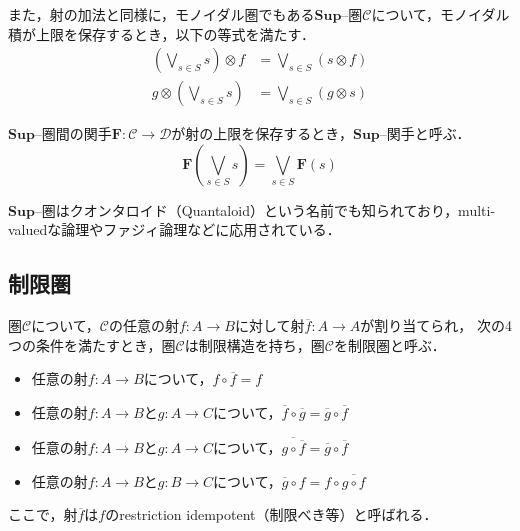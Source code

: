 \documentclass[type_judgement.tex]{subfiles}
\begin{document}
また，射の加法と同様に，モノイダル圏でもある$\mathbf{Sup}$--圏$\mathcal{C}$について，モノイダル積が上限を保存するとき，以下の等式を満たす．
\begin{align*}
  \left(\bigvee_{s\in S}s\right) \otimes f &= \bigvee_{s\in S}\left(s \otimes f\right) \\
  g \otimes \left(\bigvee_{s\in S}s\right) &= \bigvee_{s\in S}\left(g \otimes s\right)
\end{align*}

\begin{defn}\cite[Def. 1.3.(ii)]{pitts_applications_1988}
  $\mathbf{Sup}$--圏間の関手$\mathbf{F}:\mathcal{C}\rightarrow\mathcal{D}$が射の上限を保存するとき，$\mathbf{Sup}$--関手と呼ぶ．
  \begin{equation*}
    \mathbf{F}\left(\bigvee_{s\in S}s\right) = \bigvee_{s\in S}\mathbf{F}(s)
  \end{equation*}
\end{defn}

$\mathbf{Sup}$--圏はクオンタロイド（Quantaloid）という名前でも知られており\cite{stubbe_introduction_2014}，multi-valuedな論理やファジィ論理などに応用されている．

\subsection{制限圏}
\begin{defn}\cite[Def. 2.1.1.]{cockett_restriction_2002}
圏$\mathcal{C}$について，$\mathcal{C}$の任意の射$f:A \rightarrow B$に対して射$\overline{f}:A \rightarrow A$が割り当てられ，
次の4つの条件を満たすとき，圏$\mathcal{C}$は制限構造を持ち，圏$\mathcal{C}$を制限圏と呼ぶ．
\begin{itemize}
  \item 任意の射$f:A \rightarrow B$について，$f \circ \overline{f} = f$
  \item 任意の射$f:A \rightarrow B$と$g:A \rightarrow C$について，$\overline{f}\circ\overline{g}=\overline{g}\circ\overline{f}$
  \item 任意の射$f:A \rightarrow B$と$g:A \rightarrow C$について，$\overline{g\circ\overline{f}}=\overline{g}\circ\overline{f}$
  \item 任意の射$f:A \rightarrow B$と$g:B \rightarrow C$について，$\overline{g}\circ{}f=f\circ\overline{g\circ{}f}$
\end{itemize}
ここで，射$\overline{f}$は$f$のrestriction idempotent（制限べき等）と呼ばれる．
\end{defn}
\end{document}
